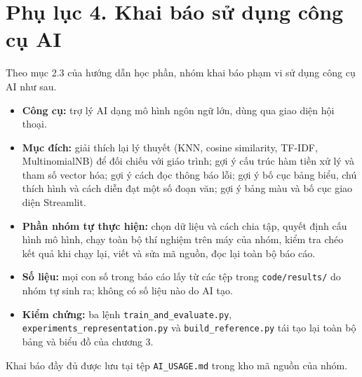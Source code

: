 \section*{Phụ lục 4. Khai báo sử dụng công cụ AI}

Theo mục 2.3 của hướng dẫn học phần, nhóm khai báo phạm vi sử dụng công cụ AI như sau.

\begin{itemize}
    \item \textbf{Công cụ:} trợ lý AI dạng mô hình ngôn ngữ lớn, dùng qua giao diện hội thoại.
    \item \textbf{Mục đích:} giải thích lại lý thuyết (KNN, cosine similarity, TF-IDF, MultinomialNB) để đối chiếu với giáo trình; gợi ý cấu trúc hàm tiền xử lý và tham số vector hóa; gợi ý cách đọc thông báo lỗi; gợi ý bố cục bảng biểu, chú thích hình và cách diễn đạt một số đoạn văn; gợi ý bảng màu và bố cục giao diện Streamlit.
    \item \textbf{Phần nhóm tự thực hiện:} chọn dữ liệu và cách chia tập, quyết định cấu hình mô hình, chạy toàn bộ thí nghiệm trên máy của nhóm, kiểm tra chéo kết quả khi chạy lại, viết và sửa mã nguồn, đọc lại toàn bộ báo cáo.
    \item \textbf{Số liệu:} mọi con số trong báo cáo lấy từ các tệp trong \texttt{code/results/} do nhóm tự sinh ra; không có số liệu nào do AI tạo.
    \item \textbf{Kiểm chứng:} ba lệnh \texttt{train\_and\_evaluate.py}, \texttt{experiments\_representation.py} và \texttt{build\_reference.py} tái tạo lại toàn bộ bảng và biểu đồ của chương 3.
\end{itemize}

Khai báo đầy đủ được lưu tại tệp \texttt{AI\_USAGE.md} trong kho mã nguồn của nhóm.

